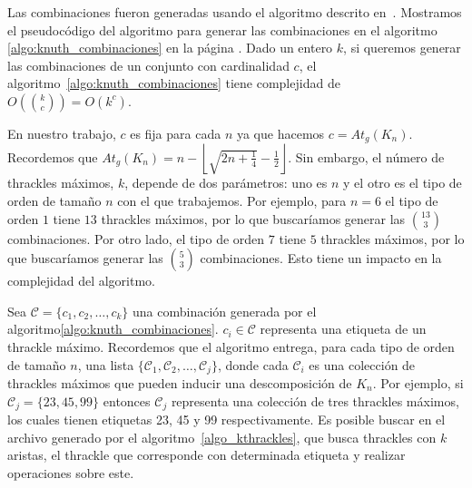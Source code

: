   Las combinaciones fueron generadas usando el algoritmo descrito en~\cite{Knuth2011A}.
  Mostramos el pseudocódigo del algoritmo para generar las combinaciones en el algoritmo
  \ref{algo:knuth_combinaciones} en la página \pageref{algo:knuth_combinaciones}. Dado un
  entero $k$, si queremos generar las combinaciones de un conjunto con cardinalidad $c$, el
  algoritmo~\ref{algo:knuth_combinaciones} tiene complejidad de
  $O\left(\binom{k}{c}\right) = O(k^c)$.

  En nuestro trabajo, $c$ es fija para cada $n$ ya que hacemos $c = At_g(K_n)$.
  Recordemos que $At_g(K_n) = n - \left\lfloor\sqrt{2n+\frac{1}{4}} -
  \frac{1}{2}\right\rfloor$. Sin embargo, el número de thrackles máximos, $k$, depende de dos parámetros: uno es $n$ y el otro es el tipo de orden de tamaño $n$ con el que trabajemos. Por ejemplo, para $n=6$ el tipo de orden $1$ tiene $13$ thrackles máximos, por lo que buscaríamos generar las $\binom{13}{3}$ combinaciones. Por otro lado, el tipo de orden $7$ tiene $5$ thrackles
  máximos, por lo que buscaríamos generar las $\binom{5}{3}$ combinaciones. Esto tiene un
  impacto en la complejidad del algoritmo.

  Sea $\mathcal{C}=\{c_1,c_2,\dots,c_k\}$ una combinación generada por el algoritmo\ref{algo:knuth_combinaciones}. $c_i\in\mathcal{C}$ representa una etiqueta de un thrackle máximo. Recordemos que el algoritmo entrega, para cada tipo de orden de tamaño $n$, una lista
  $\{\mathcal{C}_1,\mathcal{C}_2,\dots,\mathcal{C}_j\}$, donde cada $\mathcal{C}_i$ es
  una colección de thrackles máximos que pueden inducir una descomposición de $K_n$. Por
  ejemplo, si $\mathcal{C}_j=\{23,45,99\}$ entonces $\mathcal{C}_j$ representa una
  colección de tres thrackles máximos, los cuales tienen etiquetas 23, 45 y 99
  respectivamente. Es posible buscar en el archivo generado por el
  algoritmo~\ref{algo_kthrackles}, que busca thrackles con $k$ aristas, el thrackle que
  corresponde con determinada etiqueta y realizar operaciones sobre este.

